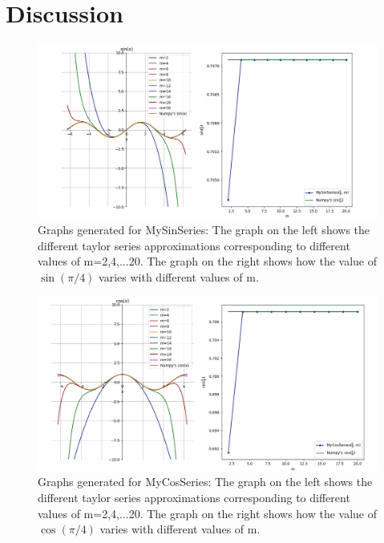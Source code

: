 \documentclass[12pt]{article}
\begin{document}
\section[]{Discussion}
\begin{figure}[H]
	\centering
	\includegraphics[width=\linewidth]{graph1}
	\caption[Graphs generated for MySinSeries]{\small Graphs generated for MySinSeries: The graph on the left shows the different taylor series approximations corresponding to different values of m=2,4,...20. The graph on the right shows how the value of $\sin(\pi/4)$ varies with different values of m.}
	\label{fig:graph1}
\end{figure}
\begin{figure}[H]
	\centering
	\includegraphics[width=\linewidth]{graph2}
	\caption[Graphs generated for MyCosSeries]{\small Graphs generated for MyCosSeries: The graph on the left shows the different taylor series approximations corresponding to different values of m=2,4,...20. The graph on the right shows how the value of $\cos(\pi/4)$ varies with different values of m.}
	\label{fig:graph2}
\end{figure}
\end{document}
